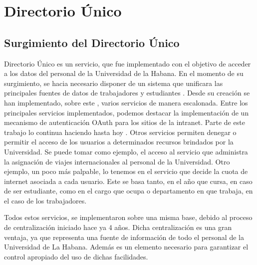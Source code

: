 \chapter{Directorio Único}

\section{Surgimiento del Directorio Único}

Directorio Único es un servicio, que fue implementado con el objetivo de acceder a los datos 
del personal de la Universidad de la Habana. En el momento de su surgimiento, se hacia 
necesario disponer de un sistema que unificara las principales fuentes de datos de 
trabajadores y estudiantes . Desde su creación se han implementado, sobre este , varios 
servicios de manera escalonada. Entre los principales servicios implementados, podemos 
destacar la implementación de un mecanismo de autenticación OAuth para los sitios de la 
intranet. Parte de este trabajo lo continua haciendo hasta hoy . Otros servicios permiten
denegar o permitir el acceso de los usuarios a determinados recursos brindados por la 
Universidad. Se puede tomar como ejemplo, el acceso al servicio que administra la 
asignación de viajes internacionales al personal de la Universidad. Otro ejemplo, un poco 
más palpable, lo tenemos en el servicio que decide la cuota de internet asociada a cada
usuario. Este se basa tanto, en el año que cursa, en caso de ser estudiante, como en el 
cargo que ocupa o departamento en que trabaja, en el caso de los trabajadores.

Todos estos servicios, se implementaron sobre una misma base, debido al proceso de 
centralización iniciado hace ya 4 años. Dicha centralización es una gran ventaja, ya
que representa una fuente de información de todo el personal de la Universidad de La Habana. 
Además es un elemento necesario para garantizar el control apropiado del uso de dichas 
facilidades. 

